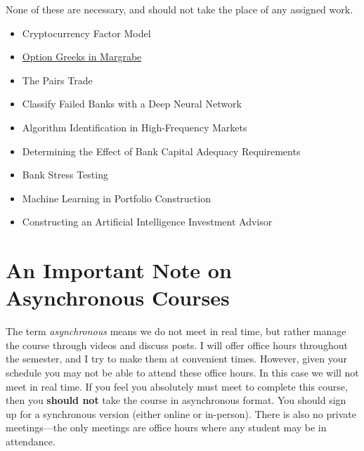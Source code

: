\documentclass[11pt]{article}
\begin{document}
None of these are necessary, and should not take the place of any assigned work.

\begin{itemize}
\item Cryptocurrency Factor Model
\item \href{https://colab.research.google.com/drive/1OtpEsx3RyoishcmKX4Q0a\_DZ2XHM3rje?usp=sharing}{Option Greeks in Margrabe}
\item The Pairs Trade
\item Classify Failed Banks with a Deep Neural Network
\item Algorithm Identification in High-Frequency Markets
\item Determining the Effect of Bank Capital Adequacy Requirements
\item Bank Stress Testing
\item Machine Learning in Portfolio Construction
\item Constructing an Artificial Intelligence Investment Advisor
\end{itemize}
\section{An Important Note on Asynchronous Courses}
\label{sec:orgfef4d96}

The term \emph{asynchronous} means we do not meet in real time, but rather manage the course through videos and discuss posts.  I will offer office hours throughout the semester, and I try to make them at convenient times. However, given your schedule you may not be able to attend these office hours.  In this case we will not meet in real time.  If you feel you absolutely must meet to complete this course, then you \textbf{\textbf{should not}} take the course in asynchronous format.  You should sign up for a synchronous version (either online or in-person).  There is also no private meetings---the only meetings are office hours where any student may be in attendance.
\end{document}
